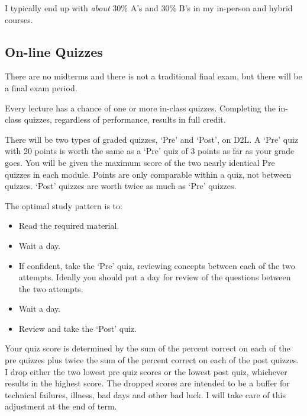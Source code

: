 \documentclass[letterpaper,10pt]{article}
\begin{document}
I typically end up with \emph{about} 30\%
A's and 30\% B's in my in-person and hybrid courses.    

\subsection{On-line Quizzes}

 There are no midterms and there is
 not a traditional final exam, but there will be a final exam period.
 
 Every lecture has a chance of one or more in-class quizzes. Completing the
 in-class quizzes, regardless of performance, results in full credit.

There will be two types of graded quizzes, `Pre' and `Post', on D2L.  A `Pre'
quiz with 20 points is worth the same as a `Pre' quiz of 3 points as
far as your grade goes.  You will be given the maximum score of the two nearly identical Pre quizzes in each module. Points are only comparable within a quiz, not
between quizzes.  `Post' quizzes are worth twice as much as `Pre' quizzes.

The optimal study pattern is to:
\begin{itemize}
\item Read the required material.
\item Wait a day.
\item If confident, take the `Pre' quiz, reviewing concepts between each of the two attempts. Ideally you should put a day for review of the questions between the two attempts.
\item Wait a day.
\item Review and take the `Post' quiz.
\end{itemize}

Your quiz score is determined by the sum of the percent correct on each of the pre quizzes plus twice the sum of the percent correct on each of the post quizzes. I drop either the two lowest pre quiz scores or the lowest post quiz, whichever results in the highest score. 
The dropped scores are intended to be a buffer for technical
failures, illness, bad days and other bad luck.  I will take care of this adjustment at the end of term.  

\end{document}
